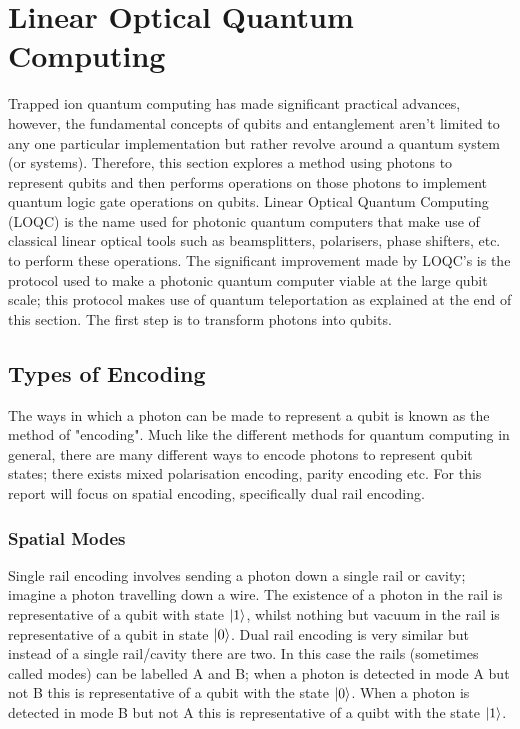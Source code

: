 
\section{Linear Optical Quantum Computing}\label{sec:Photonic}
Trapped ion quantum computing has made significant practical advances, however, the fundamental concepts of qubits and entanglement aren't limited to any one particular implementation but rather revolve around a quantum system (or systems). Therefore, this section explores a method using photons to represent qubits and then performs operations on those photons to implement quantum logic gate operations on qubits. Linear Optical Quantum Computing (LOQC) is the name used for photonic quantum computers that make use of classical linear optical tools such as beamsplitters, polarisers, phase shifters, etc. to perform these operations. The significant improvement made by LOQC's is the protocol used to make a photonic quantum computer viable at the large qubit scale; this protocol makes use of quantum teleportation as explained at the end of this section. The first step is to transform photons into qubits.

\subsection{Types of Encoding}
The ways in which a photon can be made to represent a qubit is known as the method of "encoding". Much like the different methods for quantum computing in general, there are many different ways to encode photons to represent qubit states; there exists mixed polarisation encoding, parity encoding etc. For this report will focus on spatial encoding, specifically dual rail encoding. 

\subsubsection{Spatial Modes}\label{sec:modes}
Single rail encoding involves sending a photon down a single rail or cavity; imagine a photon travelling down a wire. The existence of a photon in the rail is representative of a qubit with state $\ket{1}$, whilst nothing but vacuum in the rail is representative of a qubit in state $\ket{0}$. Dual rail encoding is very similar but instead of a single rail/cavity there are two. In this case the rails (sometimes called modes) can be labelled A and B; when a photon is detected in mode A but not B this is representative of a qubit with the state $\ket{0}$. When a photon is detected in mode B but not A this is representative of a quibt with the state $\ket{1}$. 

